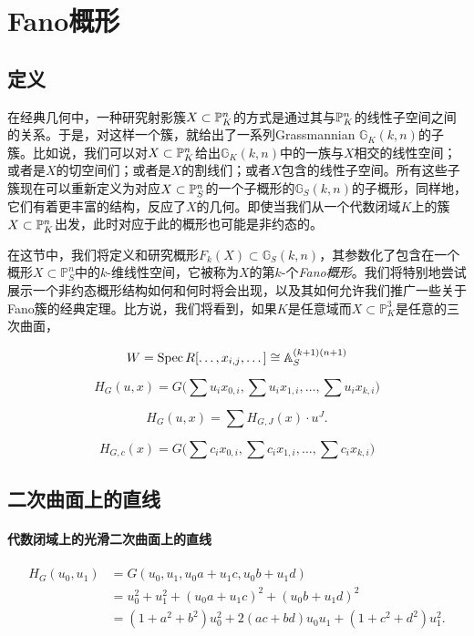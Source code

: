 \section{Fano概形}\label{s:4.3}
\subsection{定义}\label{s:4.3.1}

在经典几何中，一种研究射影簇$X\subset \mathbb{P}_K^n$的方式是通过其与$\mathbb{P}_K^n$的线性子空间之间的关系。于是，对这样一个簇，就给出了一系列Grassmannian $\mathbb G_K(k,n)$的子簇。比如说，我们可以对$X\subset \mathbb{P}_K^n$给出$\mathbb G_K(k,n)$中的一族与$X$相交的线性空间；或者是$X$的切空间们；或者是$X$的割线们；或者$X$包含的线性子空间。所有这些子簇现在可以重新定义为对应$X\subset \mathbb{P}_S^n$的一个子概形的$\mathbb G_S(k,n)$的子概形，同样地，它们有着更丰富的结构，反应了$X$的几何。即使当我们从一个代数闭域$K$上的簇$X\subset \mathbb{P}_K^n$出发，此时对应于此的概形也可能是非约态的。

在这节中，我们将定义和研究概形$F_k(X)\subset \mathbb G_S(k,n)$，其参数化了包含在一个概形$X\subset \mathbb P_S^n$中的$k$-维线性空间，它被称为$X$的第$k$-个\textit{Fano概形}。我们将特别地尝试展示一个非约态概形结构如何和何时将会出现，以及其如何允许我们推广一些关于Fano簇的经典定理。比方说，我们将看到，如果$K$是任意域而$X\subset \mathbb P_K^3$是任意的三次曲面，

\nottran


\[
	W=\operatorname{Spec} R[\dots,x_{i,j},\dots]\cong \mathbb{A}_S^{(k+1)(n+1)}
\]

\[
	H_G(u,x)=G\bigl(\sum u_ix_{0,i},\sum u_ix_{1,i},\dots,\sum u_ix_{k,i}\bigr)
\]

\[
	H_G(u,x)=\sum H_{G,J}(x)\cdot u^J.
\]

\[
	H_{G,c}(x)=G\bigl(\sum c_ix_{0,i},\sum c_ix_{1,i},\dots,\sum c_ix_{k,i}\bigr)
\]


\subsection{二次曲面上的直线}\label{s:4.3.2}

\paragraph*{代数闭域上的光滑二次曲面上的直线}

\[
	\begin{aligned}
		H_G(u_0,u_1)&=G(u_0,u_1,u_0a+u_1c,u_0b+u_1d)\\
		&=u_0^2+u_1^2+(u_0a+u_1c)^2+(u_0b+u_1d)^2\\
		&=(1+a^2+b^2)u_0^2+2(ac+bd)u_0u_1+(1+c^2+d^2)u_1^2.
	\end{aligned}
\]

